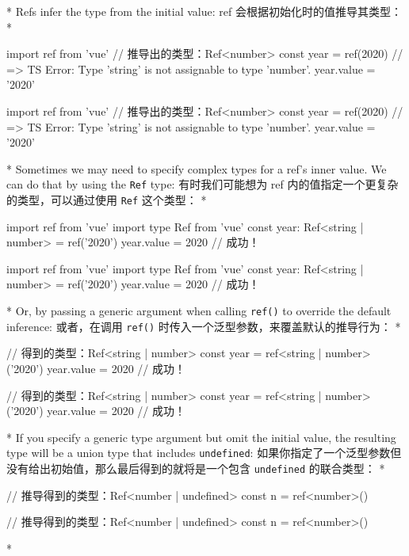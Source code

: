 \begin{paracol}{2} 
 
\switchcolumn[0]*%
Refs infer the type from the initial value:
\switchcolumn
ref 会根据初始化时的值推导其类型：
\switchcolumn[0]*%
\begin{codeTs}
import { ref } from 'vue'
// 推导出的类型：Ref<number>
const year = ref(2020)
// => TS Error: Type 'string' is not assignable to type 'number'.
year.value = '2020'
\end{codeTs}
\switchcolumn
\begin{codeTs}
import { ref } from 'vue'
// 推导出的类型：Ref<number>
const year = ref(2020)
// => TS Error: Type 'string' is not assignable to type 'number'.
year.value = '2020'
\end{codeTs}
\switchcolumn[0]*%
Sometimes we may need to specify complex types for a ref's inner value.
We can do that by using the \texttt{Ref} type:
\switchcolumn
有时我们可能想为 ref 内的值指定一个更复杂的类型，可以通过使用
\texttt{Ref} 这个类型：
\switchcolumn[0]*%
\begin{codeTs}
import { ref } from 'vue'
import type { Ref } from 'vue'
const year: Ref<string | number> = ref('2020')
year.value = 2020 // 成功！
\end{codeTs}
\switchcolumn
\begin{codeTs}
import { ref } from 'vue'
import type { Ref } from 'vue'
const year: Ref<string | number> = ref('2020')
year.value = 2020 // 成功！
\end{codeTs}
\switchcolumn[0]*%
Or, by passing a generic argument when calling \texttt{ref()} to
override the default inference:
\switchcolumn
或者，在调用 \texttt{ref()} 时传入一个泛型参数，来覆盖默认的推导行为：
\switchcolumn[0]*%
\begin{codeTs}
// 得到的类型：Ref<string | number>
const year = ref<string | number>('2020')
year.value = 2020 // 成功！
\end{codeTs}
\switchcolumn
\begin{codeTs}
// 得到的类型：Ref<string | number>
const year = ref<string | number>('2020')
year.value = 2020 // 成功！
\end{codeTs}
\switchcolumn[0]*%
If you specify a generic type argument but omit the initial value, the
resulting type will be a union type that includes \texttt{undefined}:
\switchcolumn
如果你指定了一个泛型参数但没有给出初始值，那么最后得到的就将是一个包含
\texttt{undefined} 的联合类型：
\switchcolumn[0]*%
\begin{codeTs}
// 推导得到的类型：Ref<number | undefined>
const n = ref<number>()
\end{codeTs}
\switchcolumn
\begin{codeTs}
// 推导得到的类型：Ref<number | undefined>
const n = ref<number>()
\end{codeTs}
\switchcolumn[0]*%

\end{paracol}
